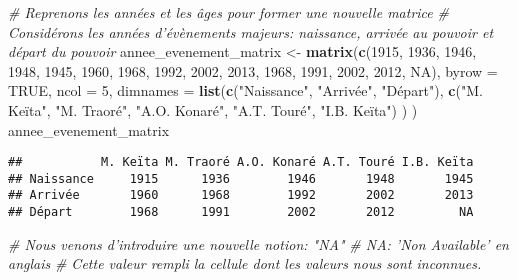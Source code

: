 \documentclass[]{book}
\newenvironment{Shaded}{\begin{snugshade}}{\end{snugshade}}
\newcommand{\KeywordTok}[1]{\textcolor[rgb]{0.13,0.29,0.53}{\textbf{#1}}}
\newcommand{\DataTypeTok}[1]{\textcolor[rgb]{0.13,0.29,0.53}{#1}}
\newcommand{\DecValTok}[1]{\textcolor[rgb]{0.00,0.00,0.81}{#1}}
\newcommand{\StringTok}[1]{\textcolor[rgb]{0.31,0.60,0.02}{#1}}
\newcommand{\CommentTok}[1]{\textcolor[rgb]{0.56,0.35,0.01}{\textit{#1}}}
\newcommand{\OtherTok}[1]{\textcolor[rgb]{0.56,0.35,0.01}{#1}}
\newcommand{\NormalTok}[1]{#1}
\begin{document}
\begin{Shaded}
\begin{Highlighting}[]
\CommentTok{# Reprenons les années et les âges pour former une nouvelle matrice}
\CommentTok{# Considérons les années d'évènements majeurs: naissance, arrivée au pouvoir et départ du pouvoir}
\NormalTok{annee_evenement_matrix <-}\StringTok{ }\KeywordTok{matrix}\NormalTok{(}\KeywordTok{c}\NormalTok{(}\DecValTok{1915}\NormalTok{, }\DecValTok{1936}\NormalTok{, }\DecValTok{1946}\NormalTok{, }\DecValTok{1948}\NormalTok{, }\DecValTok{1945}\NormalTok{,}
                                   \DecValTok{1960}\NormalTok{, }\DecValTok{1968}\NormalTok{, }\DecValTok{1992}\NormalTok{, }\DecValTok{2002}\NormalTok{, }\DecValTok{2013}\NormalTok{,}
                                   \DecValTok{1968}\NormalTok{, }\DecValTok{1991}\NormalTok{, }\DecValTok{2002}\NormalTok{, }\DecValTok{2012}\NormalTok{, }\OtherTok{NA}\NormalTok{),}
                                 \DataTypeTok{byrow =} \OtherTok{TRUE}\NormalTok{,}
                                 \DataTypeTok{ncol =} \DecValTok{5}\NormalTok{,}
                                 \DataTypeTok{dimnames =} \KeywordTok{list}\NormalTok{(}\KeywordTok{c}\NormalTok{(}\StringTok{"Naissance"}\NormalTok{, }\StringTok{"Arrivée"}\NormalTok{, }\StringTok{"Départ"}\NormalTok{),}
                                                 \KeywordTok{c}\NormalTok{(}\StringTok{"M. Keïta"}\NormalTok{, }\StringTok{"M. Traoré"}\NormalTok{, }\StringTok{"A.O. Konaré"}\NormalTok{, }\StringTok{"A.T. Touré"}\NormalTok{, }\StringTok{"I.B. Keïta"}\NormalTok{)}
\NormalTok{                                                 )}
\NormalTok{                                 )}
\NormalTok{annee_evenement_matrix}
\end{Highlighting}
\end{Shaded}

\begin{verbatim}
##           M. Keïta M. Traoré A.O. Konaré A.T. Touré I.B. Keïta
## Naissance     1915      1936        1946       1948       1945
## Arrivée       1960      1968        1992       2002       2013
## Départ        1968      1991        2002       2012         NA
\end{verbatim}

\begin{Shaded}
\begin{Highlighting}[]
\CommentTok{# Nous venons d'introduire une nouvelle notion: "NA"}
\CommentTok{# NA: 'Non Available' en anglais}
\CommentTok{# Cette valeur rempli la cellule dont les valeurs nous sont inconnues.}
\end{Highlighting}
\end{Shaded}
\end{document}
